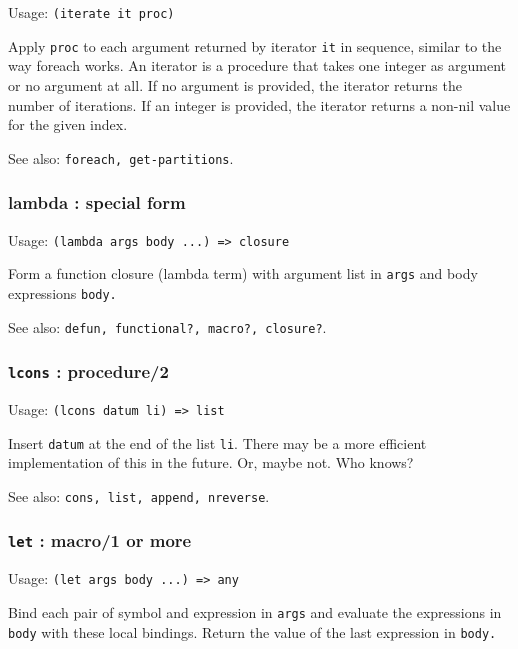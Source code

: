\documentclass[
]{article}
\newcommand{\passthrough}[1]{#1}
\begin{document}
Usage: \passthrough{\lstinline!(iterate it proc)!}

Apply \passthrough{\lstinline!proc!} to each argument returned by
iterator \passthrough{\lstinline!it!} in sequence, similar to the way
foreach works. An iterator is a procedure that takes one integer as
argument or no argument at all. If no argument is provided, the iterator
returns the number of iterations. If an integer is provided, the
iterator returns a non-nil value for the given index.

See also: \passthrough{\lstinline!foreach, get-partitions!}.

\hypertarget{lambda-special-form}{%
\subsubsection{lambda : special form}\label{lambda-special-form}}

Usage: \passthrough{\lstinline!(lambda args body ...) => closure!}

Form a function closure (lambda term) with argument list in
\passthrough{\lstinline!args!} and body expressions
\passthrough{\lstinline!body.!}

See also:
\passthrough{\lstinline!defun, functional?, macro?, closure?!}.

\hypertarget{lcons-procedure2}{%
\subsubsection{\texorpdfstring{\texttt{lcons} :
procedure/2}{lcons : procedure/2}}\label{lcons-procedure2}}

Usage: \passthrough{\lstinline!(lcons datum li) => list!}

Insert \passthrough{\lstinline!datum!} at the end of the list
\passthrough{\lstinline!li!}. There may be a more efficient
implementation of this in the future. Or, maybe not. Who knows?

See also: \passthrough{\lstinline!cons, list, append, nreverse!}.

\hypertarget{let-macro1-or-more}{%
\subsubsection{\texorpdfstring{\texttt{let} : macro/1 or
more}{let : macro/1 or more}}\label{let-macro1-or-more}}

Usage: \passthrough{\lstinline!(let args body ...) => any!}

Bind each pair of symbol and expression in
\passthrough{\lstinline!args!} and evaluate the expressions in
\passthrough{\lstinline!body!} with these local bindings. Return the
value of the last expression in \passthrough{\lstinline!body.!}
\end{document}
